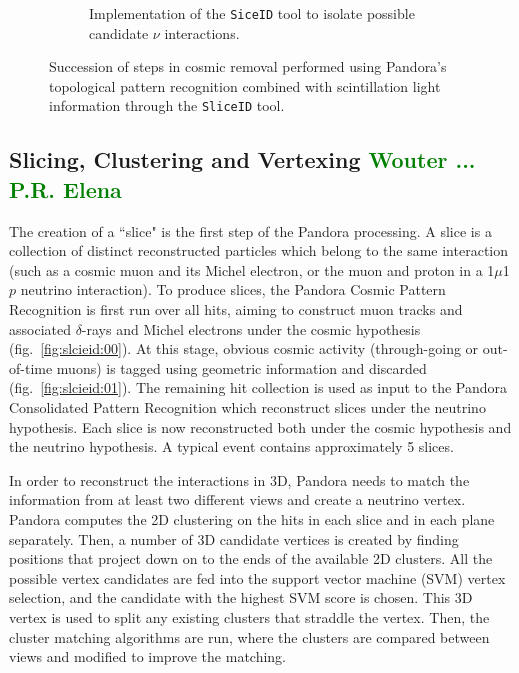 \begin{figure}[ht]
\begin{center}
\begin{subfigure}[b]{0.7\textwidth}
    \caption{\label{fig:slcieid:02} Implementation of the \texttt{SiceID} tool to isolate possible candidate $\nu$ interactions.}
    \end{subfigure}
\caption{\label{fig:sliceid} Succession of steps in cosmic removal performed using Pandora's topological pattern recognition combined with scintillation light information through the \texttt{SliceID} tool.}
\end{center}
\end{figure}

\subsection{Slicing, Clustering and Vertexing \textcolor{green}{Wouter ... P.R. Elena}}
The creation of a ``slice" is the first step of the Pandora processing. A slice is a collection of distinct reconstructed particles which belong to the same interaction (such as a cosmic muon and its Michel electron, or the muon and proton in a 1$\mu$1$p$ neutrino interaction). To produce slices, the Pandora Cosmic Pattern Recognition is first run over all hits, aiming to construct muon tracks and associated $\delta$-rays and Michel electrons under the cosmic hypothesis (fig.~\ref{fig:slcieid:00}). At this stage, obvious cosmic activity (through-going or out-of-time muons) is tagged using geometric information and discarded (fig.~\ref{fig:slcieid:01}). The remaining hit collection is used as input to the Pandora Consolidated Pattern Recognition which reconstruct slices under the neutrino hypothesis. Each slice is now reconstructed both under the cosmic hypothesis and the neutrino hypothesis. A typical event contains approximately 5 slices. 

\par In order to reconstruct the interactions in 3D, Pandora needs to match the information from at least two different views and create a neutrino vertex. Pandora computes the 2D clustering on the hits in each slice and in each plane separately. Then, a number of 3D candidate vertices is created by finding positions that project down on to the ends of the available 2D clusters. All the possible vertex candidates are fed into the support vector machine (SVM) vertex selection, and the candidate with the highest SVM score is chosen. This 3D vertex is used to split any existing clusters that straddle the vertex. Then, the cluster matching algorithms are run, where the clusters are compared between views and modified to improve the matching.

